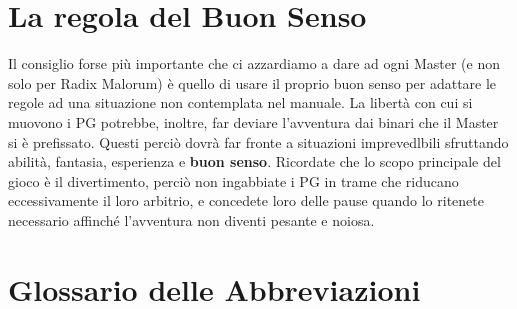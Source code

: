 {\raggedright \section{La regola del Buon Senso}}

Il consiglio forse pi\`u importante che ci azzardiamo a dare ad ogni
Master (e non solo per Radix Malorum) \`e quello di usare il proprio
buon senso per adattare le regole ad una situazione non contemplata
nel manuale. La libert\`a con cui si muovono i PG potrebbe, inoltre,
far deviare l'avventura dai binari che il Master si \`e prefissato.
Questi perci\`o dovr\`a far fronte a situazioni imprevedlbili
sfruttando abilit\`a, fantasia, esperienza e \textbf{buon senso}.
Ricordate che lo scopo principale del gioco \`e il divertimento,
perci\`o non ingabbiate i PG in trame che riducano eccessivamente il
loro arbitrio, e concedete loro delle pause quando lo ritenete
necessario affinch\'e l'avventura non diventi pesante e noiosa.
\vfill
\clearpage

{\raggedright \section{Glossario delle Abbreviazioni}}

